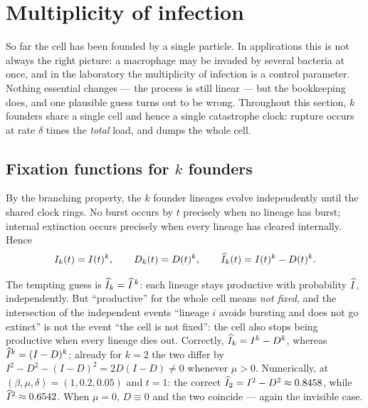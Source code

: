 
\section{Multiplicity of infection}
\label{sec:moi}

So far the cell has been founded by a single particle. In applications this
is not always the right picture: a macrophage may be invaded by several
bacteria at once, and in the laboratory the multiplicity of infection is a
control parameter. Nothing essential changes --- the process is still linear
--- but the bookkeeping does, and one plausible guess turns out to be wrong.
Throughout this section, $k$ founders share a single cell and hence a single
catastrophe clock: rupture occurs at rate $\delta$ times the \emph{total}
load, and dumps the whole cell.

\subsection{Fixation functions for $k$ founders}

By the branching property, the $k$ founder lineages evolve independently
until the shared clock rings. No burst occurs by $t$ precisely when no
lineage has burst; internal extinction occurs precisely when every lineage
has cleared internally. Hence
\begin{equation}
I_k(t)=I(t)^k,\qquad
D_k(t)=D(t)^k,\qquad
\widehat{I}_k(t)=I(t)^k-D(t)^k.
\label{eq:Ihatk}
\end{equation}

\begin{remark}
\label{rem:ihatk}
The tempting guess is $\widehat{I}_k=\widehat{I}^{\,k}$: each lineage stays productive
with probability $\widehat{I}$, independently. But ``productive'' for the whole
cell means \emph{not fixed}, and the intersection of the independent events
``lineage $i$ avoids bursting and does not go extinct'' is not the event
``the cell is not fixed'': the cell also stops being productive when every
lineage dies out. Correctly, $\widehat{I}_k=I^k-D^k$, whereas
$\widehat{I}^k=(I-D)^k$; already for $k=2$ the two differ by
$I^2-D^2-(I-D)^2=2D(I-D)\neq0$ whenever $\mu>0$. Numerically, at
$(\beta,\mu,\delta)=(1,0.2,0.05)$ and $t=1$: the correct
$\widehat{I}_2=I^2-D^2\approx0.8458$, while $\widehat{I}^2\approx0.6542$. When $\mu=0$,
$D\equiv0$ and the two coincide --- again the invisible case.
\end{remark}


